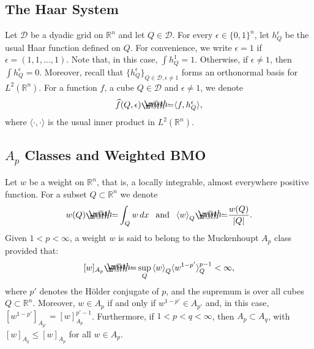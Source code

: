 \documentclass[12pt]{amsart}
\begin{document}
\subsection{The Haar System}
Let ${\mathcal{{D}}}$ be a dyadic grid on $\mathbb{R}^n$ and let $Q\in{\mathcal{{D}}}$.
For every ${\epsilon}\in\{0,1\}^{n}$, let ${h_{{Q}}^{\epsilon}}$ be the usual Haar function
defined on $Q$. For convenience, we write ${\epsilon}=1$ if ${\epsilon}=(1,1,\ldots,1)$. Note that, in this case, $\int h_{Q}^1=1$.
Otherwise, if ${\epsilon}\neq 1$, then $\int{h_{{Q}}^{\epsilon}}=0$. Moreover, recall that 
$\{{h_{{Q}}^{\epsilon}}\}_{Q\in{\mathcal{{D}}},{\epsilon}\neq 1}$ forms an orthonormal basis
for $L^2(\mathbb{R}^n)$. For a function $f$, a cube $Q\in{\mathcal{{D}}}$ and ${\epsilon}\neq 1$, we denote 
$$\widehat{f}(Q,{\epsilon}) {\mathrel{\rlap{                     \raisebox{0.3ex}{$\m@th\cdot$}}                     \raisebox{-0.3ex}{$\m@th\cdot$}}                     =} {\langle } f, h_Q^{\epsilon}{\rangle },$$ 
where ${\langle }\cdot,\cdot{\rangle }$ is the usual inner product in $L^2(\mathbb{R}^n)$.

\subsection{$A_p$ Classes and Weighted BMO} Let $w$ be a weight on $\mathbb{R}^n$, that is, a locally integrable, almost everywhere positive function. 
For a subset $Q\subset\mathbb{R}^n$ we denote 
$$ w(Q) {\mathrel{\rlap{                     \raisebox{0.3ex}{$\m@th\cdot$}}                     \raisebox{-0.3ex}{$\m@th\cdot$}}                     =} \int_Q w\,dx \:\:\text{ and }\:\: {\langle } w{\rangle }_Q {\mathrel{\rlap{                     \raisebox{0.3ex}{$\m@th\cdot$}}                     \raisebox{-0.3ex}{$\m@th\cdot$}}                     =} \frac{w(Q)}{|Q|}.$$
Given $1<p<\infty$,  a weight $w$ is said to belong to the Muckenhoupt $A_p$ class  provided that:
	$$[w]_{A_p} {\mathrel{\rlap{                     \raisebox{0.3ex}{$\m@th\cdot$}}                     \raisebox{-0.3ex}{$\m@th\cdot$}}                     =} \sup_{Q} {\langle } w{\rangle }_Q {\langle } w^{1-p'}{\rangle }_Q^{p-1} < \infty,$$
where $p'$ denotes the H\"{o}lder conjugate of $p$, and the supremum is over all cubes $Q \subset {\mathbb{R}}^n$. Moreover, $w \in A_p$ if and only if $w^{1-p'} \in A_{p'}$ and, in this case, $[w^{1-p'}]_{A_{p'}} = 
[w]_{A_p}^{p'-1}$. Furthermore, if $1<p<q<\infty$, then $A_p \subset A_q$, with $[w]_{A_q} \leq [w]_{A_p}$ for all $w \in A_p$. 
\end{document}

